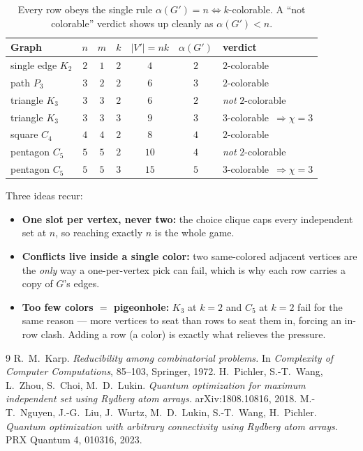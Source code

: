 \documentclass[11pt]{article}
\begin{document}
\begin{table}[h]
\centering
\begin{tabular}{@{}lcccccl@{}}
\toprule
Graph & $n$ & $m$ & $k$ & $|V'|=nk$ & $\alpha(G')$ & verdict \\
\midrule
single edge $K_2$ & $2$ & $1$ & $2$ & $4$  & $2$ & $2$-colorable \\
path $P_3$        & $3$ & $2$ & $2$ & $6$  & $3$ & $2$-colorable \\
triangle $K_3$    & $3$ & $3$ & $2$ & $6$  & $2$ & \emph{not} $2$-colorable \\
triangle $K_3$    & $3$ & $3$ & $3$ & $9$  & $3$ & $3$-colorable\ $\Rightarrow\chi=3$ \\
square $C_4$      & $4$ & $4$ & $2$ & $8$  & $4$ & $2$-colorable \\
pentagon $C_5$    & $5$ & $5$ & $2$ & $10$ & $4$ & \emph{not} $2$-colorable \\
pentagon $C_5$    & $5$ & $5$ & $3$ & $15$ & $5$ & $3$-colorable\ $\Rightarrow\chi=3$ \\
\bottomrule
\end{tabular}
\caption{Every row obeys the single rule $\alpha(G')=n \iff k$-colorable. A
``not colorable'' verdict shows up cleanly as $\alpha(G')<n$.}
\end{table}

\noindent Three ideas recur:
\begin{itemize}[leftmargin=1.4em]
  \item \textbf{One slot per vertex, never two:} the choice clique caps every
        independent set at $n$, so reaching exactly $n$ is the whole game.
  \item \textbf{Conflicts live inside a single color:} two same-colored adjacent
        vertices are the \emph{only} way a one-per-vertex pick can fail, which is
        why each row carries a copy of $G$'s edges.
  \item \textbf{Too few colors $=$ pigeonhole:} $K_3$ at $k=2$ and $C_5$ at $k=2$
        fail for the same reason --- more vertices to seat than rows to seat them
        in, forcing an in-row clash. Adding a row (a color) is exactly what
        relieves the pressure.
\end{itemize}

\begin{thebibliography}{9}
 R.~M.~Karp. \emph{Reducibility among combinatorial problems.}
  In \emph{Complexity of Computer Computations}, 85--103, Springer, 1972.
 H.~Pichler, S.-T.~Wang, L.~Zhou, S.~Choi, M.~D.~Lukin.
  \emph{Quantum optimization for maximum independent set using Rydberg atom
  arrays.} arXiv:1808.10816, 2018.
 M.-T.~Nguyen, J.-G.~Liu, J.~Wurtz, M.~D.~Lukin, S.-T.~Wang,
  H.~Pichler. \emph{Quantum optimization with arbitrary connectivity using
  Rydberg atom arrays.} PRX Quantum 4, 010316, 2023.
\end{thebibliography}
\end{document}
